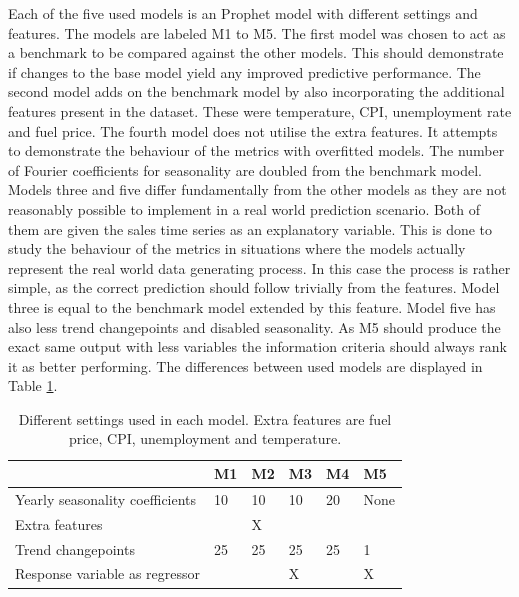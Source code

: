 \documentclass[english, 12pt, a4paper, sci, utf8, a-1b, online]{aaltothesis}
\begin{document}
Each of the five used models is an Prophet model with different settings and features. The models are labeled M1 to M5. The first model was chosen to act as a benchmark to be compared against the other models. This should demonstrate if changes to the base model yield any improved predictive performance. The second model adds on the benchmark model by also incorporating the additional features present in the dataset. These were temperature, CPI, unemployment rate and fuel price. The fourth model does not utilise the extra features. It attempts to demonstrate the behaviour of the metrics with overfitted models. The number of Fourier coefficients for seasonality are doubled from the benchmark model. Models three and five differ fundamentally from the other models as they are not reasonably possible to implement in a real world prediction scenario. Both of them are given the sales time series as an explanatory variable. This is done to study the behaviour of the metrics in situations where the models actually represent the real world data generating process. In this case the process is rather simple, as the correct prediction should follow trivially from the features. Model three is equal to the benchmark model extended by this feature. Model five has also less trend changepoints and disabled seasonality. As M5 should produce the exact same output with less variables the information criteria should always rank it as better performing. The differences between used models are displayed in Table \ref{tab:model_settings}.


\begin{table}[]
	\caption{\label{tab:model_settings} Different settings used in each model. Extra features are fuel price, CPI, unemployment and temperature.}
	\begin{tabular}{|l|l|l|l|l|l|}
		\hline
																		& \textbf{M1} & \textbf{M2} & \textbf{M3} & \textbf{M4} & \textbf{M5} \\ \hline
		Yearly seasonality coefficients & 10          & 10          & 10          & 20          & None        \\ \hline
		Extra features                  &             & X           &             &             &             \\ \hline
		Trend changepoints              & 25          & 25          & 25          & 25          & 1           \\ \hline
		Response variable as regressor  &             &             & X           &             & X           \\ \hline
		\end{tabular}
\end{table}
\end{document}
